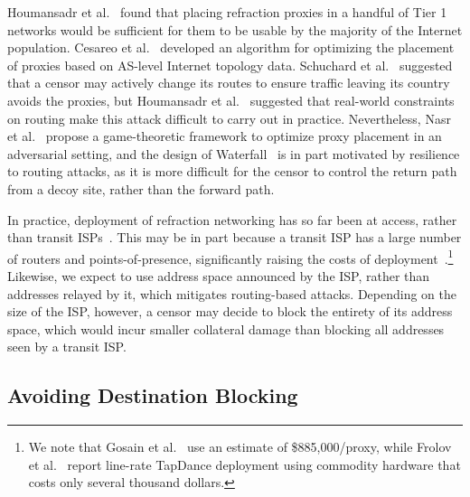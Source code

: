 Houmansadr et al.~\cite{cirripede11} found that placing refraction proxies in a handful of Tier 1 networks would be sufficient for them to be usable by the majority of the Internet population. Cesareo et al.~\cite{decoy-placement} developed an algorithm for optimizing the placement of proxies based on AS-level Internet topology data. Schuchard et al.~\cite{rad} suggested that a censor may actively change its routes to ensure traffic leaving its country avoids the proxies, but Houmansadr et al.~\cite{true-cost-rad} suggested that real-world constraints on routing make this attack difficult to carry out in practice. Nevertheless, Nasr et al.~\cite{game-of-decoys} propose a game-theoretic framework to optimize proxy placement in an adversarial setting, and the design of Waterfall~\cite{waterfall17} is in part motivated by resilience to routing attacks, as it is more difficult for the censor to control the return path from a decoy site, rather than the forward path.

In practice, deployment of refraction networking has so far been at access, rather than transit ISPs~\cite{frolov2017isp}. This may be in part because a transit ISP has a large number of routers and points-of-presence, significantly raising the costs of deployment~\cite{devil-details}.\footnote{We
note that Gosain et al.~\cite{devil-details} use an estimate of \$885,000/proxy, while Frolov et al.~\cite{frolov2017isp} report line-rate TapDance deployment using commodity hardware that costs only several thousand dollars.} Likewise, we expect \scheme to use address space announced by the ISP, rather than addresses relayed by it, which mitigates routing-based attacks. Depending on the size of the ISP, however, a censor may decide to block the entirety of its address space, which would incur smaller collateral damage than blocking all addresses seen by a transit ISP.

\subsection{Avoiding Destination Blocking}


